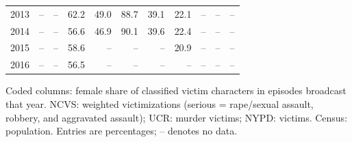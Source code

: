 \begin{center}
\begin{tabular}{@{}rrrrrrrrrrr@{}}
2013 & -- & -- & 62.2 & 49.0 & 88.7 & 39.1 & 22.1 & -- & -- & -- \\
2014 & -- & -- & 56.6 & 46.9 & 90.1 & 39.6 & 22.4 & -- & -- & -- \\
2015 & -- & -- & 58.6 & -- & -- & -- & 20.9 & -- & -- & -- \\
2016 & -- & -- & 56.5 & -- & -- & -- & -- & -- & -- & -- \\
\bottomrule
\end{tabular}
\par\smallskip
\parbox{\linewidth}{\footnotesize\raggedright Coded columns: female share of classified victim characters in episodes broadcast that year. NCVS: weighted victimizations (serious = rape/sexual assault, robbery, and aggravated assault); UCR: murder victims; NYPD: victims. Census: population.  Entries are percentages; -- denotes no data.}
\end{center}
